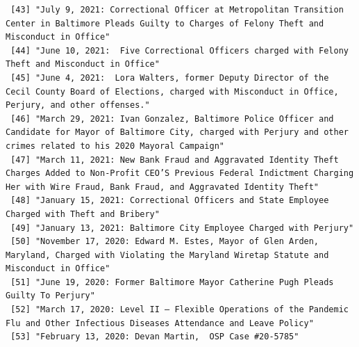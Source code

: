 \documentclass[
  letterpaper,
  DIV=11,
  numbers=noendperiod]{scrreprt}
\begin{document}
\begin{verbatim}
 [43] "July 9, 2021: Correctional Officer at Metropolitan Transition Center in Baltimore Pleads Guilty to Charges of Felony Theft and Misconduct in Office"                                                                                                 
 [44] "June 10, 2021:  Five Correctional Officers charged with Felony Theft and Misconduct in Office"                                                                                                                                                       
 [45] "June 4, 2021:  Lora Walters, former Deputy Director of the Cecil County Board of Elections, charged with Misconduct in Office, Perjury, and other offenses."                                                                                         
 [46] "March 29, 2021: Ivan Gonzalez, Baltimore Police Officer and Candidate for Mayor of Baltimore City, charged with Perjury and other crimes related to his 2020 Mayoral Campaign"                                                                       
 [47] "March 11, 2021: New Bank Fraud and Aggravated Identity Theft Charges Added to Non-Profit CEO’S Previous Federal Indictment Charging Her with Wire Fraud, Bank Fraud, and Aggravated Identity Theft"                                                  
 [48] "January 15, 2021: Correctional Officers and State Employee Charged with Theft and Bribery"                                                                                                                                                           
 [49] "January 13, 2021: Baltimore City Employee Charged with Perjury"                                                                                                                                                                                      
 [50] "November 17, 2020: Edward M. Estes, Mayor of Glen Arden, Maryland, Charged with Violating the Maryland Wiretap Statute and Misconduct in Office"                                                                                                     
 [51] "June 19, 2020: Former Baltimore Mayor Catherine Pugh Pleads Guilty To Perjury"                                                                                                                                                                       
 [52] "March 17, 2020: Level II – Flexible Operations of the Pandemic Flu and Other Infectious Diseases Attendance and Leave Policy"                                                                                                                        
 [53] "February 13, 2020: Devan Martin,  OSP Case #20-5785"                                                                                                                                                                                                 

\end{verbatim}
\end{document}
